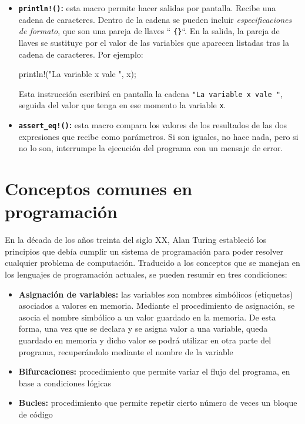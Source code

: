 \begin{itemize}
   \item \textbf{\texttt{println!()}:} esta macro permite hacer salidas por pantalla.
   Recibe una cadena de caracteres. Dentro de la cadena se pueden incluir \textit{especificaciones de formato}, que son una pareja de llaves `` \texttt{\{\}}``. En la salida, la pareja de llaves se sustituye por el valor de las variables que aparecen listadas tras la cadena de caracteres. Por ejemplo:
   
   \begin{Codigo}
      println!("La variable x vale {}", x);
   \end{Codigo}
   
   \vspace{0.8em}
   Esta instrucción escribirá en pantalla la cadena \texttt{"La variable x vale "}, seguida del valor que tenga en ese momento la variable \texttt{x}.
   
   \item \textbf{\texttt{assert\_eq!()}:} esta macro compara los valores de los resultados de las dos expresiones que recibe como parámetros. Si son iguales, no hace nada, pero si no lo son, interrumpe la ejecución del programa con un mensaje de error.
\end{itemize}

\section{Conceptos comunes en programación}
\noindent En la década de los años treinta del siglo XX, Alan Turing estableció los principios que debía cumplir un sistema de programación para poder resolver cualquier problema de computación. Traducido a los conceptos que se manejan en los lenguajes de programación actuales, se pueden resumir en tres condiciones:
\begin{itemize}
   \item \textbf{Asignación de variables:} las variables son nombres simbólicos (etiquetas) asociados a valores en memoria. Mediante el procedimiento de asignación, se asocia el nombre simbólico a un valor guardado en la memoria. De esta forma, una vez que se declara y se asigna valor a una variable, queda
   guardado en memoria y dicho valor se podrá utilizar en otra parte del programa, recuperándolo mediante el nombre de la variable
   
   \item \textbf{Bifurcaciones:} procedimiento que permite variar el flujo del programa, en base a condiciones lógicas
   
   \item \textbf{Bucles:} procedimiento que permite repetir cierto número de veces un bloque de código
\end{itemize}

